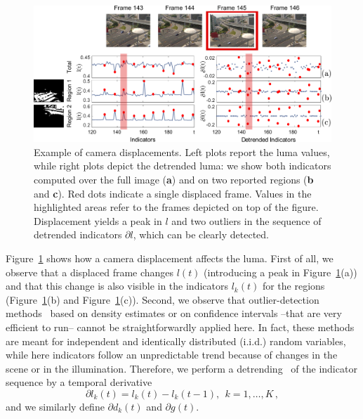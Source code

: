 \documentclass{llncs}
\begin{document}
\begin{figure}[tb]
\centering
\includegraphics[width=1\linewidth]{Immagini/indicatori}
\caption{Example of camera displacements. 
Left plots report the luma values, while right plots depict the detrended luma: 
we show both indicators computed over the full image (\textbf{a}) and on two reported regions (\textbf{b} and \textbf{c}). Red dots indicate a single displaced frame. Values in the highlighted areas refer to the frames depicted on top of the figure. 
Displacement yields a peak in $l$ and two outliers in the sequence of detrended indicators $\partial l$, which can be clearly detected.}
\label{fig:indicatori} 
\end{figure}
Figure~\ref{fig:indicatori} shows how a camera displacement affects the luma. First of all, we observe that a displaced frame changes $l(t)$ (introducing a peak in Figure~\ref{fig:indicatori}(a)) and that this change is also visible in the indicators $l_k(t)$ for the regions (Figure~\ref{fig:indicatori}(b) and Figure~\ref{fig:indicatori}(c)). Second, we observe that outlier-detection methods~\cite{Chandola2009} based on density estimates or on confidence intervals --that are very efficient to run-- cannot be straightforwardly applied here. In fact, these methods are meant for independent and identically distributed (i.i.d.) random variables, while here indicators follow an unpredictable trend because of changes in the scene or in the illumination. Therefore, we perform a detrending~\cite{Gustafsson2000} of the indicator sequence by a temporal derivative
\begin{equation}\label{eq:detrending}
 \partial l_k(t) = l_k(t)-l_k(t-1),  \ \ k = 1, \dots, K\,,
\end{equation}
and we similarly define $\partial d_k(t)$ and $\partial g(t)$. 
\end{document}
